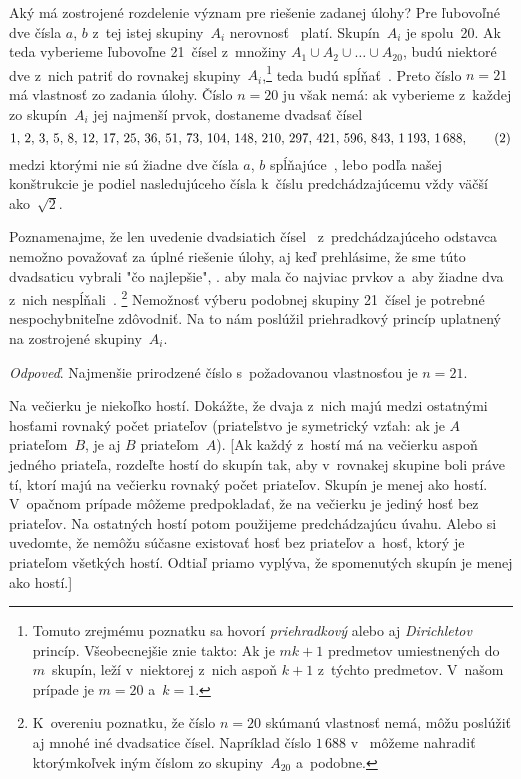 {Aký má zostrojené rozdelenie význam pre riešenie zadanej úlohy? Pre
ľubovoľné dve čísla $a$, $b$ z~tej istej skupiny~$A_i$ nerovnosť~
platí. Skupín~$A_i$ je spolu~20. Ak teda vyberieme ľubovoľne
21~čísel z~množiny $A_1\cup A_2\cup\dots \cup A_{20}$, budú niektoré
dve z~nich patriť do rovnakej skupiny~$A_i$,\footnote{Tomuto zrejmému
poznatku sa hovorí {\it priehradkový\/} alebo aj {\it Dirichletov\/}
princíp. Všeobecnejšie znie takto: Ak je $mk+1$ predmetov umiestnených do
$m$~skupín, leží v~niektorej z~nich aspoň $k+1$ z~týchto predmetov.
V~našom prípade je $m=20$ a~$k=1$.} teda budú spĺňať~.
Preto číslo $n=21$ má vlastnosť zo zadania úlohy. Číslo $n=20$ ju
však nemá: ak vyberieme z~každej zo skupín~$A_i$ jej najmenší
prvok, dostaneme dvadsať čísel
$$
\def\ {\hskip.16em}
1,\ 2,\ 3,\ 5,\ 8,\ 12,\ 17,\ 25,\ 36,\ 51,\ 73,\ 104,\ 148,\ 210,\
297,\ 421,\ 596,\ 843,\ 1\,193,\ 1\,688,                  \tag{2}
$$
medzi ktorými nie sú žiadne dve čísla $a$, $b$ spĺňajúce~, lebo
podľa našej konštrukcie je podiel nasledujúceho čísla
k~číslu predchádzajúcemu vždy väčší ako~$\sqrt2$.

Poznamenajme, že len uvedenie dvadsiatich čísel~ z~predchádzajúceho
odstavca nemožno považovať za úplné riešenie úlohy, aj keď
prehlásime, že sme túto dvadsaticu vybrali "čo najlepšie", \tj.
aby mala čo najviac prvkov a~aby žiadne dva z~nich nespĺňali~.
\footnote{K~overeniu poznatku, že číslo $n=20$ skúmanú
vlastnosť nemá, môžu poslúžiť aj mnohé iné dvadsatice čísel.
Napríklad číslo $1\,688$ v~ môžeme nahradiť ktorýmkoľvek
iným číslom zo skupiny~$A_{20}$ a~podobne.} Nemožnosť výberu podobnej
skupiny 21~čísel je potrebné nespochybniteľne zdôvodniť. Na to nám
poslúžil priehradkový princíp uplatnený na zostrojené
skupiny~$A_i$.

{\it Odpoveď\/}. Najmenšie prirodzené číslo s~požadovanou
vlastnosťou je $n=21$.

Na večierku je niekoľko hostí. Dokážte, že dvaja z~nich majú medzi
ostatnými hosťami rovnaký počet priateľov (priateľstvo je symetrický
vzťah: ak je $A$ priateľom~$B$, je aj $B$ priateľom~$A$). [Ak
každý z~hostí má na večierku aspoň jedného priateľa, rozdeľte
hostí do skupín tak, aby v~rovnakej skupine boli práve tí, ktorí majú
na večierku rovnaký počet priateľov. Skupín je menej ako hostí.
V~opačnom prípade môžeme predpokladať, že na večierku je jediný
hosť bez priateľov. Na ostatných hostí potom použijeme predchádzajúcu úvahu.
Alebo si uvedomte, že nemôžu súčasne existovať hosť bez priateľov
a~hosť, ktorý je priateľom všetkých hostí. Odtiaľ priamo
vyplýva, že spomenutých skupín je menej ako hostí.]

}
